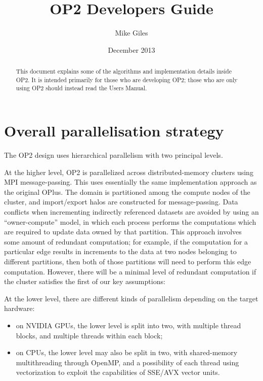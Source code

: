 \documentclass[11pt]{article}
\date{December 2013}
\begin{document}
\title{OP2 Developers Guide}
\author{Mike Giles}

\maketitle

\begin{abstract}
This document explains some of the algorithms and implementation
details inside OP2.  It is intended primarily for those who are
developing OP2; those who are only using OP2 should instead read
the Users Manual.
\vspace*{0.2in}
\end{abstract}

\newpage

\tableofcontents

\newpage

\section{Overall parallelisation strategy}

The OP2 design uses hierarchical parallelism with two principal levels.

At the higher level, OP2 is parallelized across distributed-memory
clusters using MPI message-passing.  This uses essentially the same
implementation approach as the original OPlus.  The domain is
partitioned among the compute nodes of the cluster, and import/export
halos are constructed for message-passing.  Data conflicts when
incrementing indirectly referenced datasets are avoided by using an
``owner-compute'' model, in which each process performs the computations
which are required to update data owned by that partition.  This approach
involves some amount of redundant computation; for example, if the
computation for a particular edge results in increments to the data at
two nodes belonging to different partitions, then both of those partitions
will need to perform this edge computation.  However, there will be a
minimal level of redundant computation if the cluster satisfies the first
of our key assumptions:

\vspace{0.1in}
\vspace{0.1in}

\noindent At the lower level, there are different kinds of parallelism depending
on the target hardware:
\begin{itemize}
\item
on NVIDIA GPUs, the lower level is split into two, with multiple
thread blocks, and multiple threads within each block;
\item
on CPUs, the lower level may also be split in two, with shared-memory
multithreading through OpenMP, and a possibility of each thread using
vectorization to exploit the capabilities of SSE/AVX vector units.
\end{itemize}
\end{document}

